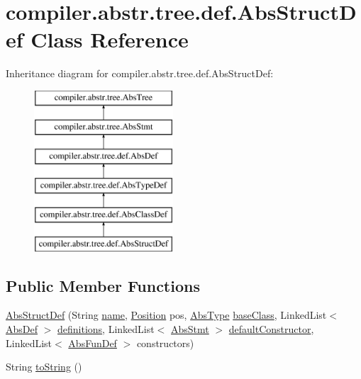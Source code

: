 \hypertarget{classcompiler_1_1abstr_1_1tree_1_1def_1_1_abs_struct_def}{}\section{compiler.\+abstr.\+tree.\+def.\+Abs\+Struct\+Def Class Reference}
\label{classcompiler_1_1abstr_1_1tree_1_1def_1_1_abs_struct_def}
Inheritance diagram for compiler.\+abstr.\+tree.\+def.\+Abs\+Struct\+Def\+:\begin{figure}[H]
\begin{center}
\leavevmode
\includegraphics[height=6.000000cm]{classcompiler_1_1abstr_1_1tree_1_1def_1_1_abs_struct_def}
\end{center}
\end{figure}
\subsection*{Public Member Functions}
\begin{DoxyCompactItemize}
\item 
\hyperlink{classcompiler_1_1abstr_1_1tree_1_1def_1_1_abs_struct_def_a14999b6bc00ab1658b7d052fb1fd6418}{Abs\+Struct\+Def} (String \hyperlink{classcompiler_1_1abstr_1_1tree_1_1def_1_1_abs_def_ac6bda9377f5abbb5f1be7d3d1b16481b}{name}, \hyperlink{classcompiler_1_1_position}{Position} pos, \hyperlink{classcompiler_1_1abstr_1_1tree_1_1type_1_1_abs_type}{Abs\+Type} \hyperlink{classcompiler_1_1abstr_1_1tree_1_1def_1_1_abs_class_def_abdae78a199f920488fa89f40fc123fa9}{base\+Class}, Linked\+List$<$ \hyperlink{classcompiler_1_1abstr_1_1tree_1_1def_1_1_abs_def}{Abs\+Def} $>$ \hyperlink{classcompiler_1_1abstr_1_1tree_1_1def_1_1_abs_class_def_a150268afc17218143bf4caf8a1db9c96}{definitions}, Linked\+List$<$ \hyperlink{classcompiler_1_1abstr_1_1tree_1_1_abs_stmt}{Abs\+Stmt} $>$ \hyperlink{classcompiler_1_1abstr_1_1tree_1_1def_1_1_abs_class_def_ac9a16d0a80e785164055560fc5b1c198}{default\+Constructor}, Linked\+List$<$ \hyperlink{classcompiler_1_1abstr_1_1tree_1_1def_1_1_abs_fun_def}{Abs\+Fun\+Def} $>$ constructors)
\item 
String \hyperlink{classcompiler_1_1abstr_1_1tree_1_1def_1_1_abs_struct_def_af141875c00e403614ea7ad9245fef7fc}{to\+String} ()
\end{DoxyCompactItemize}

